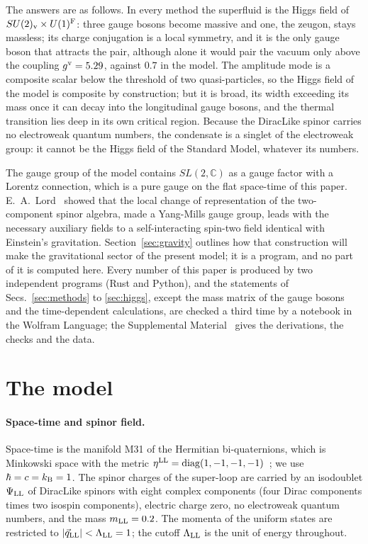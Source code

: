 \documentclass[aps,prd,twocolumn,superscriptaddress,nofootinbib,floatfix,longbibliography]{revtex4-2}
\newcommand{\LL}{{\rm LL}}
\begin{document}
The answers are as follows. In every method the superfluid is the Higgs field of $SU(2)_{\rm v}\times U(1)^{\rm F}$: three gauge
bosons become massive and one, the zeugon, stays massless; its charge conjugation is a local symmetry, and it is the only
gauge boson that attracts the pair, although alone it would pair the vacuum only above the coupling
$g^{\rm v}=5.29$, against $0.7$ in the model. The amplitude mode is a composite scalar below the threshold of two
quasi-particles, so the Higgs field of the model is composite by construction; but it is broad, its width exceeding its
mass once it can decay into the longitudinal gauge bosons, and the thermal transition lies deep in its own critical
region. Because the DiracLike spinor carries no electroweak quantum numbers, the condensate is a singlet of the electroweak
group: it cannot be the Higgs field of the Standard Model, whatever its numbers.

The gauge group of the model contains $SL(2,\mathbb C)$ as a gauge factor with a Lorentz connection, which is a pure gauge
on the flat space-time of this paper. E.~A.~Lord~\cite{Lord1971} showed that the local change of representation of the
two-component spinor algebra, made a Yang-Mills gauge group, leads with the necessary auxiliary fields to a self-interacting
spin-two field identical with Einstein's gravitation. Section~\ref{sec:gravity} outlines how that construction will
make the gravitational sector of the present model; it is a program, and no part of it is computed here. Every number of
this paper is produced by two independent programs (Rust and Python), and the statements of Secs.~\ref{sec:methods} to
\ref{sec:higgs}, except the mass matrix of the gauge bosons and the time-dependent calculations, are checked a third time by
a notebook in the Wolfram Language; the Supplemental Material~\cite{SM} gives the derivations, the checks and the data.

\section{The model}
\label{sec:model}

\paragraph*{Space-time and spinor field.}
Space-time is the manifold M31 of the Hermitian bi-quaternions, which is Minkowski space with the metric
$\eta^\LL={\rm diag}(1,-1,-1,-1)$~\cite{Nash2026}; we use $\hbar=c=k_{\rm B}=1$. The spinor charges of the super-loop are
carried by an isodoublet $\Psi_\LL$ of DiracLike spinors with eight complex components (four Dirac components times two
isospin components), electric charge zero, no electroweak quantum numbers, and the mass $m_\LL=0.2$. The momenta of the uniform states are restricted to $|\vec q_\LL|<\Lambda_\LL=1$; the cutoff
$\Lambda_\LL$ is the unit of energy throughout.
\end{document}
